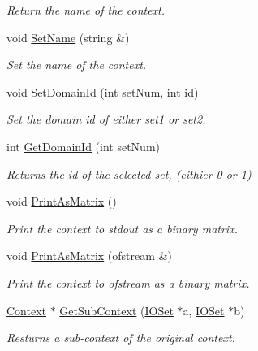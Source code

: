 \begin{DoxyCompactItemize}
\begin{DoxyCompactList}\small\item\em Return the name of the context. \item\end{DoxyCompactList}\item 
void \hyperlink{class_context_a8d86d8eaafc65601e65b0b77a691071b}{SetName} (string \&)
\begin{DoxyCompactList}\small\item\em Set the name of the context. \item\end{DoxyCompactList}\item 
void \hyperlink{class_context_ac7eb147a11e84e49cda654ecc3812fe5}{SetDomainId} (int setNum, int \hyperlink{class_context_a134a1f80c8256db2afdb6d6f3096e0d6}{id})
\begin{DoxyCompactList}\small\item\em Set the domain id of either set1 or set2. \item\end{DoxyCompactList}\item 
int \hyperlink{class_context_aaa470e3eb23649e665329a5764a16019}{GetDomainId} (int setNum)
\begin{DoxyCompactList}\small\item\em Returns the id of the selected set, (eithier 0 or 1) \item\end{DoxyCompactList}\item 
void \hyperlink{class_context_af7785111a88d3e31d7168e3f9aed2759}{PrintAsMatrix} ()
\begin{DoxyCompactList}\small\item\em Print the context to stdout as a binary matrix. \item\end{DoxyCompactList}\item 
void \hyperlink{class_context_aac2e8802d5547c971735b1e1b496c90f}{PrintAsMatrix} (ofstream \&)
\begin{DoxyCompactList}\small\item\em Print the context to ofstream as a binary matrix. \item\end{DoxyCompactList}\item 
\hyperlink{class_context}{Context} $\ast$ \hyperlink{class_context_a8bfdcf16db7537122236cab328358e8d}{GetSubContext} (\hyperlink{class_i_o_set}{IOSet} $\ast$a, \hyperlink{class_i_o_set}{IOSet} $\ast$b)
\begin{DoxyCompactList}\small\item\em Resturns a sub-\/context of the original context. \item\end{DoxyCompactList}\item 

\end{DoxyCompactItemize}
